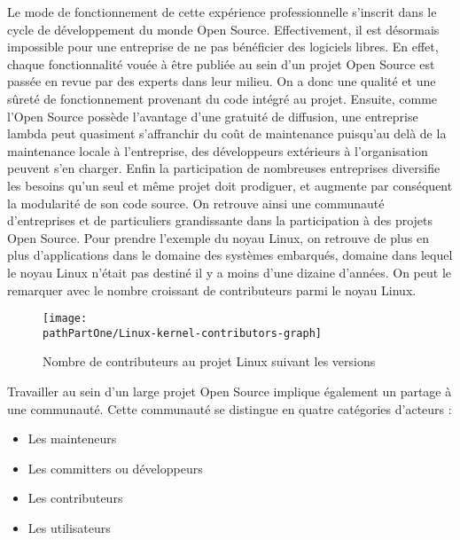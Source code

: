 Le mode de fonctionnement de cette expérience professionnelle s'inscrit dans
le cycle de développement du monde Open Source.  Effectivement, il est
désormais impossible pour une entreprise de ne pas bénéficier des logiciels
libres. En effet, chaque fonctionnalité vouée à être publiée au sein d'un
projet Open Source est passée en revue par des experts dans leur milieu. On a
donc une qualité et une sûreté de fonctionnement provenant du code intégré au
projet. Ensuite, comme l'Open Source possède l'avantage d'une gratuité de
diffusion, une entreprise lambda peut quasiment s'affranchir du coût de
maintenance puisqu'au delà de la maintenance locale à l'entreprise, des
développeurs extérieurs à l'organisation peuvent s'en charger. Enfin la
participation de nombreuses entreprises diversifie les besoins qu'un seul et
même projet doit prodiguer, et augmente par conséquent la modularité de son
code source. On retrouve ainsi une communauté d'entreprises et de particuliers
grandissante dans la participation à des projets Open Source. Pour prendre
l'exemple du noyau Linux, on retrouve de plus en plus d'applications dans le
domaine des systèmes embarqués, domaine dans lequel le noyau Linux n'était pas
destiné il y a moins d'une dizaine d'années. On peut le remarquer avec le
nombre croissant de contributeurs parmi le noyau Linux. \\

\begin{figure}[H]
	\begin{center}
		\texttt{[image: \\pathPartOne/Linux-kernel-contributors-graph]}
		\caption{Nombre de contributeurs au projet Linux suivant les versions}
	    \label{fig:contributors_graph}
	\end{center}
\end{figure}

Travailler au sein d'un large projet Open Source implique également un partage
à une communauté. Cette communauté se distingue en quatre catégories d'acteurs :

\begin{itemize}[label=\textbullet]
    \item Les mainteneurs
    \item Les committers ou développeurs
    \item Les contributeurs
    \item Les utilisateurs
\end{itemize}

